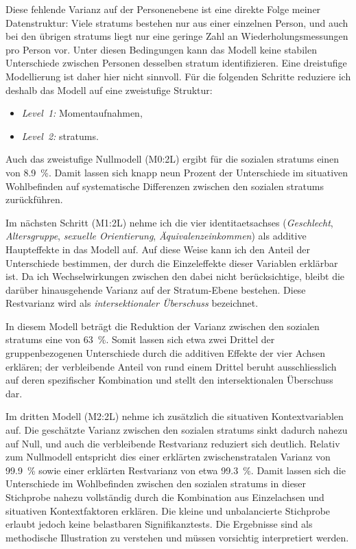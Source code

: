 Diese fehlende Varianz auf der Personenebene ist eine direkte Folge meiner Datenstruktur: Viele \glspl{stratum} bestehen nur aus einer einzelnen Person, und auch bei den übrigen \glspl{stratum} liegt nur eine geringe Zahl an Wiederholungsmessungen pro Person vor. Unter diesen Bedingungen kann das Modell keine stabilen Unterschiede zwischen Personen desselben \gls{stratum} identifizieren. Eine dreistufige Modellierung ist daher hier nicht sinnvoll. Für die folgenden Schritte reduziere ich deshalb das Modell auf eine zweistufige Struktur:

\begin{itemize}
    \item \emph{Level~1:} Momentaufnahmen,
    \item \emph{Level~2:} \glspl{stratum}.
\end{itemize}

Auch das zweistufige Nullmodell (M0:2L) ergibt für die sozialen \glspl{stratum} einen  von 8.9~\%. Damit lassen sich knapp neun Prozent der Unterschiede im situativen Wohlbefinden auf systematische Differenzen zwischen den sozialen \glspl{stratum} zurückführen.

Im nächsten Schritt (M1:2L) nehme ich die vier \glspl{identitaetsachse} (\emph{Geschlecht}, \emph{Altersgruppe}, \emph{sexuelle Orientierung}, \emph{Äquivalenzeinkommen}) als additive Haupteffekte in das Modell auf. Auf diese Weise kann ich den Anteil der Unterschiede bestimmen, der durch die Einzeleffekte dieser Variablen erklärbar ist. Da ich Wechselwirkungen zwischen den  dabei nicht berücksichtige, bleibt die darüber hinausgehende Varianz auf der Stratum-Ebene bestehen. Diese Restvarianz wird als \emph{intersektionaler Überschuss} bezeichnet.

In diesem Modell beträgt die Reduktion der Varianz zwischen den sozialen \glspl{stratum} eine  von 63~\%. Somit lassen sich etwa zwei Drittel der gruppenbezogenen Unterschiede durch die additiven Effekte der vier Achsen erklären; der verbleibende Anteil von rund einem Drittel beruht ausschliesslich auf deren spezifischer Kombination und stellt den intersektionalen Überschuss dar.

Im dritten Modell (M2:2L) nehme ich zusätzlich die situativen Kontextvariablen auf. Die geschätzte Varianz zwischen den sozialen \glspl{stratum} sinkt dadurch nahezu auf Null, und auch die verbleibende Restvarianz reduziert sich deutlich. Relativ zum Nullmodell entspricht dies einer erklärten zwischenstratalen Varianz von 99.9~\% sowie einer erklärten Restvarianz von etwa 99.3~\%. Damit lassen sich die Unterschiede im Wohlbefinden zwischen den sozialen \glspl{stratum} in dieser Stichprobe nahezu vollständig durch die Kombination aus Einzelachsen und situativen Kontextfaktoren erklären. Die kleine und unbalancierte Stichprobe erlaubt jedoch keine belastbaren Signifikanztests. Die Ergebnisse sind als methodische Illustration zu verstehen und müssen vorsichtig interpretiert werden.


